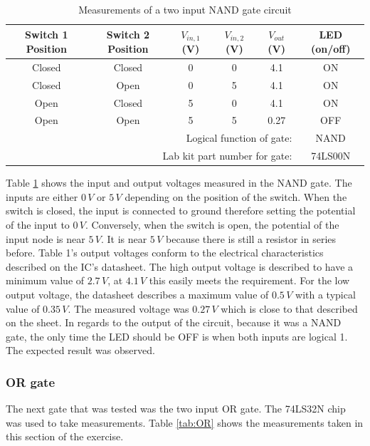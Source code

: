 \documentclass[CMPE]{KGCOEReport}
\begin{document}
\begin{table}[h]
\renewcommand{\arraystretch}{1.2}
\caption{Measurements of a two input NAND gate circuit}
\begin{center}
\begin{tabular}{|c|c|c|c|c|c|}
\hline
Switch 1 Position & Switch 2 Position & $V_{in,1}$ (V) & $V_{in,2}$ (V) & $V_{out}$ (V) & LED (on/off)\\\hline

Closed & Closed & 0 & 0 & 4.1  & ON \\\hline
Closed & Open   & 0 & 5 & 4.1  & ON \\\hline
Open   & Closed & 5 & 0 & 4.1  & ON \\\hline
Open   & Open   & 5 & 5 & 0.27 & OFF \\\hline
\multicolumn{5}{|r|}{Logical function of gate: } & NAND  \\\hline
\multicolumn{5}{|r|}{Lab kit part number for gate: } & 74LS00N  \\\hline

\end{tabular}
\end{center}
\label{tab:NAND}
\end{table}

Table \ref{tab:NAND} shows the input and output voltages measured in the NAND gate. The inputs are either $0\,V$ or $5\,V$ depending on the position of the switch. When the switch is closed, the input is connected to ground therefore setting the potential of the input to $0\,V$. Conversely, when the switch is open, the potential of the input node is near $5\,V$. It is near $5\,V$ because there is still a resistor in series before. Table 1's output voltages conform to the electrical characteristics described on the IC's datasheet. The high output voltage is described to have a minimum value of $2.7\,V$, at $4.1\,V$ this easily meets the requirement. For the low output voltage, the datasheet describes a maximum value of $0.5\,V$ with a typical value of $0.35\,V$. The measured voltage was $0.27\,V$ which is close to that described on the sheet. In regards to the output of the circuit, because it was a NAND gate, the only time the LED should be OFF is when both inputs are logical 1. The expected result was observed.


\subsubsection{OR gate}
The next gate that was tested was the two input OR gate. The 74LS32N chip was used to take measurements. Table \ref{tab:OR} shows the measurements taken in this section of the exercise.
\end{document}
